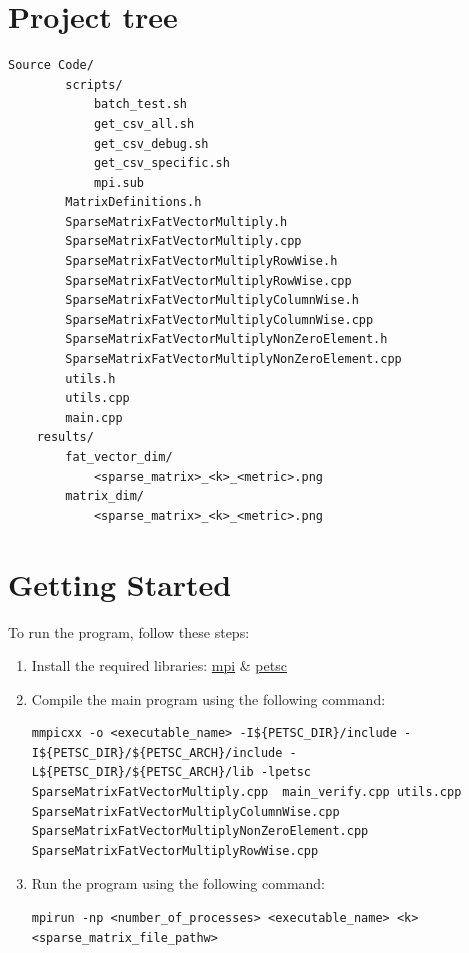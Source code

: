\documentclass[12pt,oneside]{book} %
\begin{document}
\begin{subappendices}
    \section{Project tree}
    \begin{lstlisting}[breaklines=true, basicstyle=\small]
    Source Code/
        scripts/
            batch_test.sh
            get_csv_all.sh
            get_csv_debug.sh
            get_csv_specific.sh
            mpi.sub
        MatrixDefinitions.h
        SparseMatrixFatVectorMultiply.h
        SparseMatrixFatVectorMultiply.cpp
        SparseMatrixFatVectorMultiplyRowWise.h
        SparseMatrixFatVectorMultiplyRowWise.cpp
        SparseMatrixFatVectorMultiplyColumnWise.h
        SparseMatrixFatVectorMultiplyColumnWise.cpp
        SparseMatrixFatVectorMultiplyNonZeroElement.h
        SparseMatrixFatVectorMultiplyNonZeroElement.cpp
        utils.h
        utils.cpp
        main.cpp
    results/
        fat_vector_dim/
            <sparse_matrix>_<k>_<metric>.png
        matrix_dim/
            <sparse_matrix>_<k>_<metric>.png
    \end{lstlisting}

    \section{Getting Started}
    To run the program, follow these steps:
    \begin{enumerate}
        \itemindent=17.87pt
        \item Install the required libraries:
              \href{https://docs.open-mpi.org/en/main/installing-open-mpi/quickstart.html}{mpi}
              \& \href{https://petsc.org/release/install/}{petsc}
        \item Compile the main program using the following command:
              \begin{lstlisting}[style=bashstyle]
                mmpicxx -o <executable_name> -I${PETSC_DIR}/include -I${PETSC_DIR}/${PETSC_ARCH}/include -L${PETSC_DIR}/${PETSC_ARCH}/lib -lpetsc SparseMatrixFatVectorMultiply.cpp  main_verify.cpp utils.cpp SparseMatrixFatVectorMultiplyColumnWise.cpp SparseMatrixFatVectorMultiplyNonZeroElement.cpp SparseMatrixFatVectorMultiplyRowWise.cpp
            \end{lstlisting}
        \item Run the program using the following command:
              \begin{lstlisting}[style=bashstyle]
                mpirun -np <number_of_processes> <executable_name> <k> <sparse_matrix_file_pathw>
            \end{lstlisting}
    \end{enumerate}


\end{subappendices}
\end{document}

